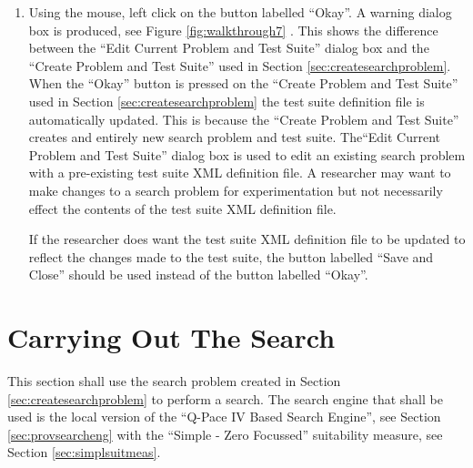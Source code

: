 \begin{enumerate}
\item Using the mouse, left click on the button labelled ``Okay''.
A warning dialog box is produced, see Figure \ref{fig:walkthrough7} .
This shows the difference between the ``Edit Current Problem and Test Suite'' dialog box and the ``Create Problem and Test Suite'' used in Section \ref{sec:createsearchproblem}.
When the ``Okay'' button is pressed on the ``Create Problem and Test Suite'' used in Section \ref{sec:createsearchproblem} the test suite definition file is automatically updated.
This is because the ``Create Problem and Test Suite'' creates and entirely new search problem and test suite.
The``Edit Current Problem and Test Suite'' dialog box is used to edit an existing search problem with a pre-existing test suite XML definition file.
A researcher may want to make changes to a search problem for experimentation but not necessarily effect the contents of the test suite XML definition file.

If the researcher does want the test suite XML definition file to be updated to reflect the changes made to the test suite, the button labelled ``Save and Close'' should be used instead of the button labelled ``Okay''.

\end{enumerate}

\section{Carrying Out The Search}
\label{sec:carryingoutthesearch}

This section shall use the search problem created in Section \ref{sec:createsearchproblem} to perform a search.
The search engine that shall be used is the local version of the ``Q-Pace IV Based Search Engine'', see Section \ref{sec:provsearcheng} with the ``Simple - Zero Focussed'' suitability measure, see Section \ref{sec:simplsuitmeas}.

